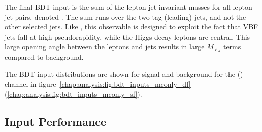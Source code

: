 The final BDT input is the sum of the lepton-jet invariant masses for
all lepton-jet pairs, denoted \SumMlj. The sum runs over the two tag (leading)
jets, and not the other selected jets. Like \lepEtaCent, this
observable is designed to exploit the fact that VBF jets fall at high
pseudorapidity, while the Higgs decay leptons are central. This large
opening angle between the leptons and jets results in large $M_{\ell
j}$ terms compared to background. 

The BDT input distributions are shown for signal and background for
the \emme (\eemm) channel in figure~\ref{chap:analysis:fig:bdt_inputs_mconly_df} (\ref{chap:analysis:fig:bdt_inputs_mconly_sf}). 

\subsection{Input Performance}



